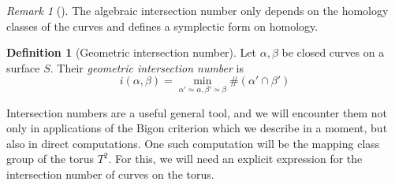 \documentclass[reqno]{amsart}
\theoremstyle{definition}
\newtheorem{definition}[theorem]{Definition}
\theoremstyle{remark}
\newtheorem*{remark}{Remark}
\begin{document}
\begin{remark}[]
    The algebraic intersection number only depends on the
    homology classes of the curves and defines
    a symplectic form on homology.
\end{remark}

\begin{definition}[Geometric intersection number]
    Let $\alpha, \beta$ be closed curves on a surface $S$.
    Their \textit{geometric intersection number} is
    \[
    i \left( \alpha, \beta \right) =
    \min_{\alpha' \simeq \alpha, \beta' \simeq \beta}
    \# \left( \alpha' \cap \beta' \right) 
    \] 
\end{definition}

Intersection numbers are a useful general tool, and we will
encounter them not only in applications of the Bigon criterion
which we describe in a moment, but also in direct computations.
One such computation will be the mapping class group of the
torus $T^2$. For this, we will need an explicit expression
for the intersection number of curves on the torus.
\end{document}
